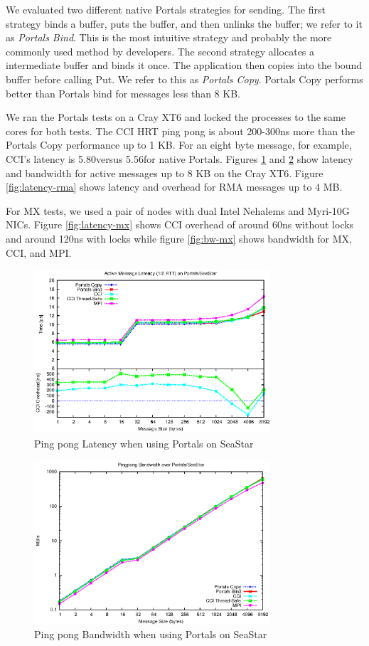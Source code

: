 We evaluated two different native Portals strategies for sending. The first strategy
binds a buffer, puts the buffer, and then unlinks the buffer; we refer to it as
\emph{Portals Bind}. This is the most intuitive strategy and probably the more
commonly used method by developers. The second strategy allocates a intermediate
buffer and binds it once. The application then copies into the bound buffer before
calling Put. We refer to this as \emph{Portals Copy}. Portals Copy performs better
than Portals bind for messages less than 8 KB.

We ran the Portals tests on a Cray XT6 and locked the processes to the same cores for
both tests. The CCI HRT ping pong is about 200-300ns more than the Portals Copy
performance up to 1 KB.  For an eight byte message, for example, CCI's latency is
5.80\us versus 5.56\us for native Portals.  Figures \ref{fig:latency-portals} and
\ref{fig:bw-portals} show latency and bandwidth for active messages up to 8 KB on the Cray
XT6. Figure \ref{fig:latency-rma} shows latency and overhead for RMA messages up to 4
MB.

For MX tests, we used a pair of nodes with dual Intel Nehalems and Myri-10G NICs.
Figure \ref{fig:latency-mx} shows CCI overhead of around 60ns without locks and
around 120ns with locks while figure \ref{fig:bw-mx} shows bandwidth for MX, CCI, and
MPI.

\begin{figure}[htbp]
\centering
\includegraphics[width=3.45in]{pingpong-latency-portals-overhead-combined.eps}
\caption{Ping pong Latency when using Portals on SeaStar}
\label{fig:latency-portals}
\end{figure}

\begin{figure}[htbp]
\centering
\includegraphics[width=3.45in]{pingpong-bw-portals.eps}
\caption{Ping pong Bandwidth when using Portals on SeaStar}
\label{fig:bw-portals}
\end{figure}

